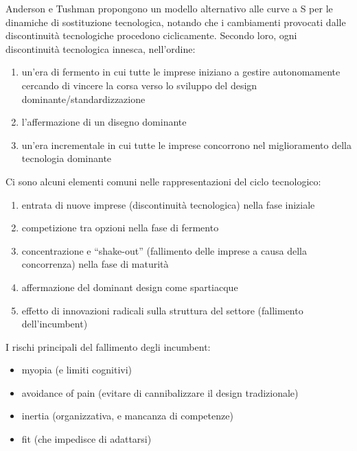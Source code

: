 \documentclass[answers, a4paper, 11pt]{exam}
\begin{document}
Anderson e Tushman propongono un modello alternativo alle curve a S per le dinamiche di sostituzione tecnologica, notando che i cambiamenti provocati dalle discontinuità tecnologiche procedono ciclicamente. 
Secondo loro, ogni discontinuità tecnologica innesca, nell'ordine:
\begin{enumerate}
    \item un'era di fermento in cui tutte le imprese iniziano a gestire autonomamente cercando di vincere la corsa verso lo sviluppo del design dominante/standardizzazione
    \item l'affermazione di un disegno dominante
    \item un'era incrementale in cui tutte le imprese concorrono nel miglioramento della tecnologia dominante
\end{enumerate}

Ci sono alcuni elementi comuni nelle rappresentazioni del ciclo tecnologico:
\begin{enumerate}
    \item entrata di nuove imprese (discontinuità tecnologica) nella fase iniziale
    \item competizione tra opzioni nella fase di fermento
    \item concentrazione e ``shake-out'' (fallimento delle imprese a causa della concorrenza) nella fase di maturità 
    \item affermazione del dominant design come spartiacque 
    \item effetto di innovazioni radicali sulla struttura del settore (fallimento dell'incumbent)
\end{enumerate}

I rischi principali del fallimento degli incumbent:
\begin{itemize}
    \item myopia (e limiti cognitivi)
    \item avoidance of pain (evitare di cannibalizzare il design tradizionale)
    \item inertia (organizzativa, e mancanza di competenze)
    \item fit (che impedisce di adattarsi)
\end{itemize}
\end{document}
